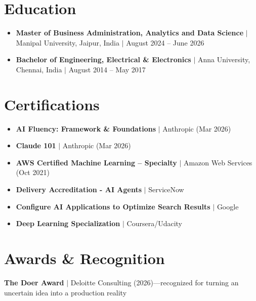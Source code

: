 \documentclass[letterpaper,10pt]{article}
\begin{document}
\section{Education}
 \begin{itemize}[leftmargin=0.15in, label={}, itemsep=1pt, parsep=0pt, topsep=4pt]\small
    \item \textbf{Master of Business Administration, Analytics and Data Science} $|$ Manipal University, Jaipur, India $|$ August 2024 -- June 2026
    \item \textbf{Bachelor of Engineering, Electrical \& Electronics} $|$ Anna University, Chennai, India $|$ August 2014 -- May 2017
 \end{itemize}


\section{Certifications}
\vspace{8pt}
 \begin{itemize}[leftmargin=0.15in, label={}]
    \small
    \item \textbf{AI Fluency: Framework \& Foundations} $|$ Anthropic (Mar 2026)
    \item \textbf{Claude 101} $|$ Anthropic (Mar 2026)
    \item \textbf{AWS Certified Machine Learning -- Specialty} $|$ Amazon Web Services (Oct 2021)
    \item \textbf{Delivery Accreditation - AI Agents} $|$ ServiceNow
    \item \textbf{Configure AI Applications to Optimize Search Results} $|$ Google
    \item \textbf{Deep Learning Specialization} $|$ Coursera/Udacity
 \end{itemize}


\section{Awards \& Recognition}
\vspace{8pt}
 \begin{itemize}[leftmargin=0.15in, label={}]
    \small{\item{
     \textbf{The Doer Award} $|$ Deloitte Consulting (2026)---recognized for turning an uncertain idea into a production reality
    }}
 \end{itemize}
\end{document}
